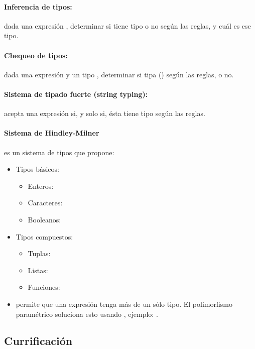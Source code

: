 \paragraph{Inferencia de tipos:} dada una expresión , determinar si tiene tipo o no según las reglas, y cuál es ese tipo.

\paragraph{Chequeo de tipos:} dada una expresión  y un tipo , determinar si  tipa  () según las reglas, o no.

\paragraph{Sistema de tipado fuerte (string typing):} acepta una expresión si, y solo si, ésta tiene tipo según las reglas.

\paragraph{Sistema de Hindley-Milner} es un sistema de tipos que propone:

\begin{itemize}
  \item Tipos básicos:
    \begin{itemize}
      \item Enteros: 
      \item Caracteres: 
      \item Booleanos: 
    \end{itemize}
  \item Tipos compuestos:
    \begin{itemize}
      \item Tuplas: 
      \item Listas: \xtt{[A]}
      \item Funciones: 
    \end{itemize}
  \item {} permite que una expresión tenga más de un sólo tipo. El polimorfismo paramétrico soluciona esto usando , ejemplo: .
\end{itemize}

\subsection{Currificación}

